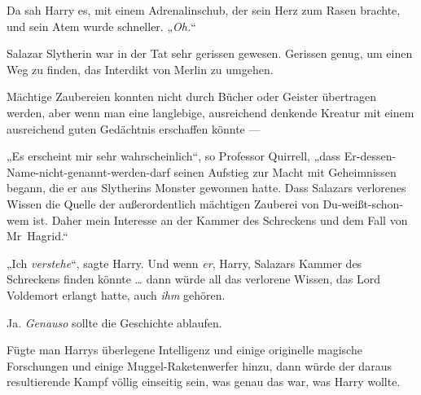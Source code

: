 Da sah Harry es, mit einem Adrenalinschub, der sein Herz zum Rasen brachte, und sein Atem wurde schneller.
„\emph{Oh.}“

Salazar Slytherin war in der Tat sehr gerissen gewesen. Gerissen genug, um einen Weg zu finden, das Interdikt von Merlin zu umgehen.

Mächtige Zaubereien konnten nicht durch Bücher oder Geister übertragen werden, aber wenn man eine langlebige, ausreichend denkende Kreatur mit einem ausreichend guten Gedächtnis erschaffen könnte —

„Es erscheint mir sehr wahrscheinlich“, so Professor Quirrell, „dass Er-dessen-Name-nicht-genannt-werden-darf seinen Aufstieg zur Macht mit Geheimnissen begann, die er aus Slytherins Monster gewonnen hatte. Dass Salazars verlorenes Wissen die Quelle der außerordentlich mächtigen Zauberei von Du-weißt-schon-wem ist. Daher mein Interesse an der Kammer des Schreckens und dem Fall von Mr~Hagrid.“

„Ich \emph{verstehe}“, sagte Harry. Und wenn \emph{er}, Harry, Salazars Kammer des Schreckens finden könnte … dann würde all das verlorene Wissen, das Lord Voldemort erlangt hatte, auch \emph{ihm} gehören.

Ja. \emph{Genauso} sollte die Geschichte ablaufen.

Fügte man Harrys überlegene Intelligenz und einige originelle magische Forschungen und einige Muggel-Raketenwerfer hinzu, dann würde der daraus resultierende Kampf völlig einseitig sein, was genau das war, was Harry wollte.

